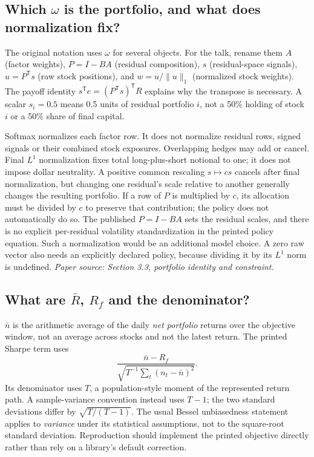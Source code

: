 \documentclass[11pt]{article}
\begin{document}
\subsection{Which \texorpdfstring{$\omega$}{omega} is the portfolio, and what does normalization fix?}

The original notation uses $\omega$ for several objects. For the talk,
rename them $A$ (factor weights), $P=I-BA$ (residual composition), $s$
(residual-space signals), $u=P^{\mathsf T}s$ (raw stock positions), and
$w=u/\lVert u\rVert_1$ (normalized stock weights). The payoff identity
$s^{\mathsf T}e=(P^{\mathsf T}s)^{\mathsf T}R$ explains why the transpose
is necessary. A scalar $s_i=0.5$ means 0.5 units of residual portfolio
$i$, not a 50\% holding of stock $i$ or a 50\% share of final capital.

Softmax normalizes each factor row. It does not normalize residual rows,
signed signals or their combined stock exposures. Overlapping hedges may
add or cancel. Final $L^1$ normalization fixes total long-plus-short
notional to one; it does not impose dollar neutrality. A positive common
rescaling $s\mapsto cs$ cancels after final normalization, but changing
one residual's scale relative to another generally changes the resulting
portfolio. If a row of $P$ is multiplied by $c$, its allocation must be
divided by $c$ to preserve that contribution; the policy does not
automatically do so. The published $P=I-BA$ sets the residual scales, and
there is no explicit per-residual volatility standardization in the
printed policy equation. Such a normalization would be an additional
model choice. A zero raw vector also needs an explicitly declared policy,
because dividing it by its $L^1$ norm is undefined.
\emph{Paper source: Section 3.3, portfolio identity and constraint.}

\subsection{What are \texorpdfstring{$\bar R$, $R_f$}{mean R, risk-free R} and the denominator?}

$\bar n$ is the arithmetic average of the daily \emph{net portfolio}
returns over the objective window, not an average across stocks and not
the latest return. The printed Sharpe term uses
\[
\frac{\bar n-R_f}
{\sqrt{T^{-1}\sum_t(n_t-\bar n)^2}}.
\]
Its denominator uses $T$, a population-style moment of the represented
return path. A sample-variance convention instead uses $T-1$; the two
standard deviations differ by $\sqrt{T/(T-1)}$. The usual Bessel
unbiasedness statement applies to \emph{variance} under its statistical
assumptions, not to the square-root standard deviation. Reproduction
should implement the printed objective directly rather than rely on a
library's default correction.
\end{document}
